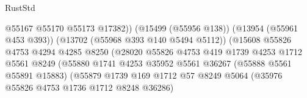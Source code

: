 \begin{lexlean}{RustStd}
\begin{coremodule}
                                                    @55167
                                                    @55170
                                                    @55173
                                                    @17382))
                                                (@15499 (@55956 @138))
                                                (@13954 (@55961 @453 @393))
                                                (@13702 (@55968 @393 @140 @5494 @5112))
                                                (@15608
                                                  @55826
                                                  @4753
                                                  @4294
                                                  @4285
                                                  @8250
                                                  (@28020
                                                    @55826
                                                    @4753
                                                    @419
                                                    @1739
                                                    @4253
                                                    @1712
                                                    @5561
                                                    @8249
                                                    (@55880
                                                      @1741
                                                      @4253
                                                      @35952
                                                      @5561
                                                      @36267
                                                      (@55888 @5561 @55891 @15883)
                                                      (@55879
                                                        @1739
                                                        @169
                                                        @1712
                                                        @57
                                                        @8249
                                                        @5064
                                                        (@35976
                                                          @55826
                                                          @4753
                                                          @1736
                                                          @1712
                                                          @8248
                                                          @36286)

\end{coremodule}
\end{lexlean}
